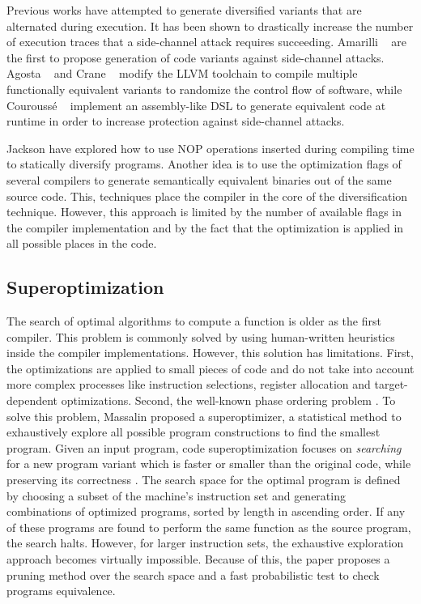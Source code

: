 Previous works have attempted to generate diversified variants that are alternated during execution.
It has been shown to drastically increase the number of execution traces that a side-channel attack requires succeeding.
Amarilli \etal~\cite{amarilli2011can} are the first to propose generation of code variants against side-channel attacks.
Agosta \etal~\cite{agosta2015meet} and Crane \etal~\cite{crane2015thwarting}
modify the LLVM toolchain to compile multiple functionally equivalent variants to randomize the control flow of software,
while Courouss{\'e} \etal~\cite{courousse2016runtime} implement an assembly-like DSL to generate equivalent code at runtime in order to increase protection against side-channel attacks. 


Jackson \etal \cite{jackson} have explored how to use NOP operations inserted during compiling time to statically diversify programs. Another idea is to use the optimization flags of several compilers to generate semantically equivalent binaries out of the same source code. This, techniques place the compiler in the core of the diversification technique. However, this approach is limited by the number of available flags in the compiler implementation and by the fact that the optimization is applied in all possible places in the code.


\subsection*{Superoptimization}

The search of optimal algorithms to compute a function is older as the first compiler. This problem is commonly solved by using human-written heuristics inside the compiler implementations. However, this solution has limitations. First, the optimizations are applied to small pieces of code and do not take into account more complex processes like instruction selections, register allocation and target-dependent optimizations. Second, the well-known phase ordering problem \cite{phase-ordering-problem}. To solve this problem, Massalin \etal \cite{Massalin1987} proposed a superoptimizer, a statistical method to exhaustively explore all possible program constructions to find the smallest program.
Given an input program, code superoptimization focuses on \emph{searching} for a new program variant which is faster or smaller than the original code, while preserving its correctness \cite{bunel_learning_2017}.
The search space for the optimal program is defined by choosing a subset of the machine's instruction set and generating combinations of optimized programs, sorted by length in ascending order. If any of these programs are found to perform the same function as the source program, the search halts. However, for larger instruction sets, the exhaustive exploration approach becomes virtually impossible.
Because of this, the paper proposes a pruning method over the search space and a fast probabilistic test to check programs equivalence.

